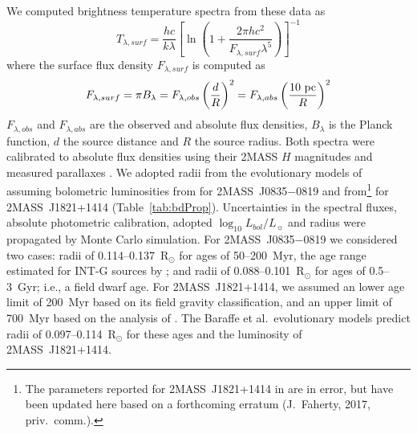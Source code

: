 \documentclass[twocolumn]{aastex6}
\newcommand{\lbol}{$\log_{10}{L_{bol}/L_{\sun}}$}
\newcommand{\sha}{2MASS~J0835$-$0819}
\newcommand{\shb}{2MASS~J1821+1414}
\begin{document}
We computed brightness temperature spectra from these data as
\begin{equation}
T_{\lambda,surf} = \frac{hc}{k\lambda}\left[\ln\left(1+\frac{2\pi{hc^2}}{F_{\lambda,surf}\lambda^5}\right)\right]^{-1}
\end{equation}
where the surface flux density $F_{\lambda,surf}$ is computed as
\begin{equation}
F_{\lambda,surf} = {\pi}B_{\lambda} = F_{\lambda,obs}\left(\frac{d}{R}\right)^2 = F_{\lambda,abs}\left(\frac{10~{\rm pc}}{R}\right)^2
\end{equation}
$F_{\lambda,obs}$ and $F_{\lambda,abs}$ are the observed and absolute flux densities, $B_\lambda$ is the Planck function, $d$ the source distance and $R$ the source radius.  Both spectra were calibrated to absolute flux densities using their 2MASS $H$ magnitudes and measured parallaxes \citep{2016MNRAS.455..357S,2016AJ....152...24W}. We adopted radii from the evolutionary models of \citet{2003A&A...402..701B} assuming bolometric luminosities from \citet{2015ApJ...810..158F} for {\sha} and from\footnote{The parameters reported for {\shb} in \citet{2016ApJS..225...10F} are in error, but have been updated here based on a forthcoming erratum (J.\ Faherty, 2017, priv.\ comm.).}  \citet{2016ApJS..225...10F} for {\shb} (Table~\ref{tab:bdProp}). Uncertainties in the spectral fluxes, absolute photometric calibration, adopted {\lbol} and radius were propagated by Monte Carlo simulation.  For {\sha} we considered two cases: radii of 0.114--0.137~R$_{\odot}$ for ages of 50--200~Myr, the age range estimated for INT-G sources by \citet{2013ApJ...772...79A}; and radii of 0.088--0.101~R$_{\odot}$ for ages of 0.5--3~Gyr; i.e., a field dwarf age.
For {\shb}, we assumed an lower age limit of 200~Myr based on its field gravity classification, and an upper limit of 700~Myr based on the analysis of \citet{2016MNRAS.455..357S}. The Baraffe et al.\ evolutionary models predict radii of 0.097--0.114~R$_{\odot}$ for these ages and the luminosity of {\shb}.  
\end{document}
